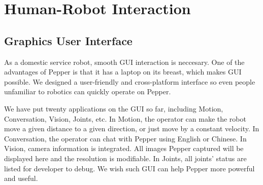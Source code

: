 \section{Human-Robot Interaction}
\label{sec:hri}

\subsection{Graphics User Interface}
\label{subsec:gui}
As a domestic service robot, smooth GUI interaction is neccesary. 
One of the advantages of Pepper is that it has a laptop on its breast, which makes GUI possible. 
We designed a user-friendly and cross-platform interface so even people unfamiliar to robotics can quickly operate on Pepper. 

We have put twenty applications on the GUI so far, including Motion, Conversation, Vision, Joints, etc. 
In Motion, the operator can make the robot move a given distance to a given direction, or just move by a constant velocity.
In Conversation, the operator can chat with Pepper using English or Chinese.
In Vision, camera information is integrated. All images Pepper captured will be displayed here and the resolution is modifiable.
In Joints, all joints' status are listed for developer to debug.
We wish such GUI can help Pepper more powerful and useful.

